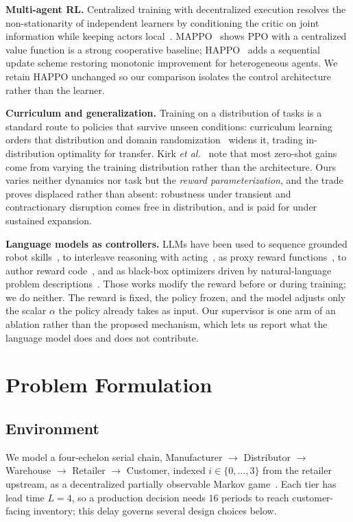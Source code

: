 \documentclass[conference]{IEEEtran}
\begin{document}
\textbf{Multi-agent RL.} Centralized training with decentralized execution
resolves the non-stationarity of independent learners by conditioning the
critic on joint information while keeping actors local~\cite{lowe2017}.
MAPPO~\cite{yu2021} shows PPO with a centralized value function is a
strong cooperative baseline; HAPPO~\cite{kuba2021} adds a sequential
update scheme restoring monotonic improvement for heterogeneous agents.
We retain HAPPO unchanged so our comparison isolates the control
architecture rather than the learner.

\textbf{Curriculum and generalization.} Training on a distribution of tasks
is a standard route to policies that survive unseen conditions: curriculum
learning~\cite{bengio2009} orders that distribution and domain
randomization~\cite{tobin2017} widens it, trading in-distribution
optimality for transfer. Kirk \emph{et al.}~\cite{kirk2023} note that most
zero-shot gains come from varying the training distribution rather than the
architecture. Ours varies neither dynamics nor task but the \emph{reward
parameterization}, and the trade proves displaced rather than absent:
robustness under transient and contractionary disruption comes free in
distribution, and is paid for under sustained expansion.

\textbf{Language models as controllers.} LLMs have been used to sequence
grounded robot skills~\cite{ahn2022}, to interleave reasoning with
acting~\cite{yao2023}, as proxy reward functions~\cite{kwon2023}, to
author reward code~\cite{ma2024}, and as black-box
optimizers driven by natural-language problem
descriptions~\cite{yang2024}. Those works modify the reward before or during
training; we do neither. The reward is fixed, the policy frozen, and the
model adjusts only the scalar $\alpha$ the policy already takes as input.
Our supervisor is one arm of an ablation rather than the proposed
mechanism, which lets us report what the language model does and does not
contribute.

\section{Problem Formulation}

\subsection{Environment}
We model a four-echelon serial chain, Manufacturer $\rightarrow$
Distributor $\rightarrow$ Warehouse $\rightarrow$ Retailer $\rightarrow$
Customer, indexed $i \in \{0,\dots,3\}$ from the retailer upstream, as a
decentralized partially observable Markov game~\cite{littman1994}. Each
tier has lead time $L=4$, so a production decision needs $16$ periods to
reach customer-facing inventory; this delay governs several design
choices below.
\end{document}
